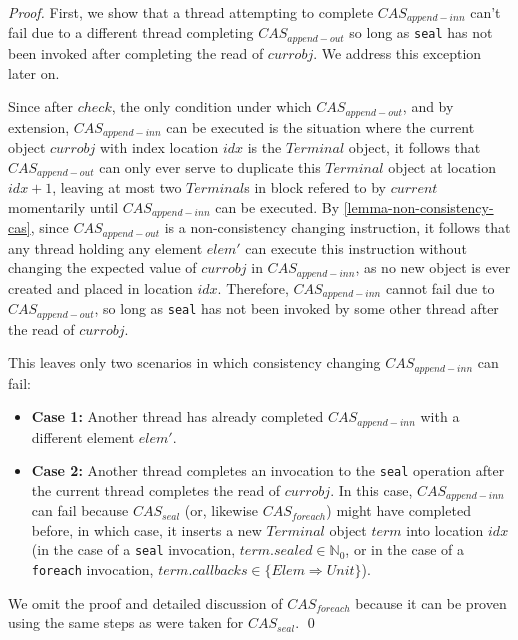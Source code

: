 \documentclass[runningheads,a4paper]{llncs}
\begin{document}
\begin{proof}
First, we show that a thread attempting to complete $CAS_{append-inn}$ can't fail due to a
different thread completing $CAS_{append-out}$ so long as \verb=seal= has not been invoked
after completing the read of $currobj$. We address this exception later on.

Since after $check$, the only condition under which $CAS_{append-out}$, and by
extension, $CAS_{append-inn}$ can be executed is the situation where the
current object $currobj$ with index location $idx$ is the $Terminal$ object,
it follows that $CAS_{append-out}$ can only ever serve to duplicate this
$Terminal$ object at location $idx+1$, leaving at most two $Terminal$s in
block refered to by $current$ momentarily until $CAS_{append-inn}$ can be
executed. By \ref{lemma-non-consistency-cas}, since $CAS_{append-out}$ is a non-consistency changing
instruction, it follows that any thread holding any element $elem'$ can
execute this instruction without changing the expected value of $currobj$ in
$CAS_{append-inn}$, as no new object is ever created and placed in location
$idx$. Therefore, $CAS_{append-inn}$ cannot fail due to $CAS_{append-out}$, so
long as \verb=seal= has not been invoked by some other thread after the read
of $currobj$.

This leaves only two scenarios in which consistency changing 
$CAS_{append-inn}$ can fail:

\begin{itemize}
\item \textbf{Case 1:} Another thread has already completed $CAS_{append-inn}$ with a 
different element $elem'$.
\item \textbf{Case 2:} Another thread completes an invocation to the \verb=seal= 
operation after the current thread completes the read of $currobj$. In this 
case, $CAS_{append-inn}$ can fail because $CAS_{seal}$ (or, likewise $CAS_{foreach}$) 
might have completed before, in which case, it inserts a new $Terminal$ object $term$ 
into location $idx$ (in the case of a \verb=seal= invocation, 
$term.sealed\in\mathbb{N}_0$, or in the case of a \verb=foreach= invocation, 
$term.callbacks\in\{Elem \Rightarrow Unit\}$). 
\end{itemize}

We omit the proof and detailed discussion of $CAS_{foreach}$ because it can be proven 
using the same steps as were taken for $CAS_{seal}$. 
\qed
\end{proof}

\end{document}
